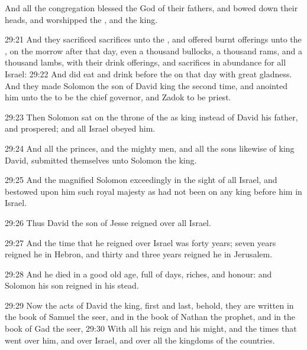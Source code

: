 And all the congregation blessed the \LORD God of their fathers, and
bowed down their heads, and worshipped the \LORD, and the king.

29:21 And they sacrificed sacrifices unto the \LORD, and offered burnt
offerings unto the \LORD, on the morrow after that day, even a thousand
bullocks, a thousand rams, and a thousand lambs, with their drink
offerings, and sacrifices in abundance for all Israel: 29:22 And did
eat and drink before the \LORD on that day with great gladness. And
they made Solomon the son of David king the second time, and anointed
him unto the \LORD to be the chief governor, and Zadok to be priest.

29:23 Then Solomon sat on the throne of the \LORD as king instead of
David his father, and prospered; and all Israel obeyed him.

29:24 And all the princes, and the mighty men, and all the sons
likewise of king David, submitted themselves unto Solomon the king.

29:25 And the \LORD magnified Solomon exceedingly in the sight of all
Israel, and bestowed upon him such royal majesty as had not been on
any king before him in Israel.

29:26 Thus David the son of Jesse reigned over all Israel.

29:27 And the time that he reigned over Israel was forty years; seven
years reigned he in Hebron, and thirty and three years reigned he in
Jerusalem.

29:28 And he died in a good old age, full of days, riches, and honour:
and Solomon his son reigned in his stead.

29:29 Now the acts of David the king, first and last, behold, they are
written in the book of Samuel the seer, and in the book of Nathan the
prophet, and in the book of Gad the seer, 29:30 With all his reign and
his might, and the times that went over him, and over Israel, and over
all the kingdoms of the countries.


